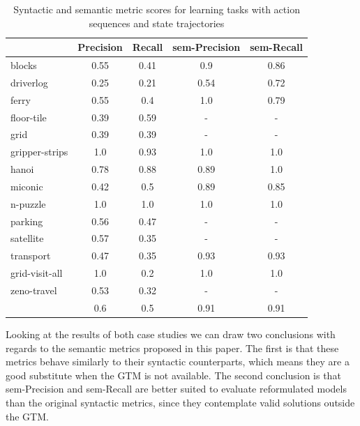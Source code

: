 \begin{table}[hbt!]
	\begin{center}		
		\begin{tabular}{l|c|c|c|c|}		
			& {\bf Precision} & {\bf Recall} & {\bf sem-Precision} & {\bf sem-Recall} \\
			\hline
			blocks & 0.55 & 0.41 & 0.9 & 0.86 \\
			driverlog & 0.25 & 0.21 & 0.54 & 0.72 \\
			ferry & 0.55 & 0.4 & 1.0 & 0.79 \\
			floor-tile & 0.39 & 0.59 & - & - \\
			grid & 0.39 & 0.39 & - & - \\
			gripper-strips & 1.0 & 0.93 & 1.0 & 1.0 \\
			hanoi & 0.78 & 0.88 & 0.89 & 1.0 \\
			miconic & 0.42 & 0.5 & 0.89 & 0.85 \\
			n-puzzle & 1.0 & 1.0 & 1.0 & 1.0 \\
			parking & 0.56 & 0.47 & - & - \\
			satellite & 0.57 & 0.35 & - & - \\
			transport & 0.47 & 0.35 & 0.93 & 0.93 \\
			grid-visit-all & 1.0 & 0.2 & 1.0 & 1.0 \\
			zeno-travel & 0.53 & 0.32 & - & - \\
			\hline
			& 0.6 & 0.5 & 0.91 & 0.91
		\end{tabular}
	\end{center}
	\caption{\small Syntactic and semantic metric scores for learning tasks with \NO action sequences and \NO state trajectories}
	\label{tab:metric_comparison_0_0}
\end{table}


Looking at the results of both case studies we can draw two conclusions with regards to the semantic metrics proposed in this paper. The first is that these metrics behave similarly to their syntactic counterparts, which means they are a good substitute when the GTM is not available. The second conclusion is that sem-Precision and sem-Recall are better suited to evaluate reformulated models than the original syntactic metrics, since they contemplate valid solutions outside the GTM.




